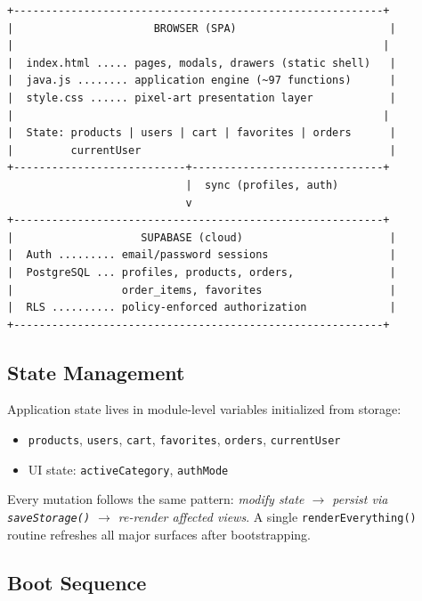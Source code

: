 \documentclass[11pt,a4paper]{article}
\begin{document}
\begin{lstlisting}[caption={Layered architecture (simplified).},language={}]
+----------------------------------------------------------+
|                      BROWSER (SPA)                        |
|                                                          |
|  index.html ..... pages, modals, drawers (static shell)   |
|  java.js ........ application engine (~97 functions)      |
|  style.css ...... pixel-art presentation layer            |
|                                                          |
|  State: products | users | cart | favorites | orders      |
|         currentUser                                       |
+---------------------------+------------------------------+
                            |  sync (profiles, auth)
                            v
+----------------------------------------------------------+
|                    SUPABASE (cloud)                       |
|  Auth ......... email/password sessions                   |
|  PostgreSQL ... profiles, products, orders,               |
|                 order_items, favorites                    |
|  RLS .......... policy-enforced authorization             |
+----------------------------------------------------------+
\end{lstlisting}

\subsection{State Management}

Application state lives in module-level variables initialized from storage:

\begin{itemize}[nosep]
    \item \texttt{products}, \texttt{users}, \texttt{cart},
          \texttt{favorites}, \texttt{orders}, \texttt{currentUser}
    \item UI state: \texttt{activeCategory}, \texttt{authMode}
\end{itemize}

Every mutation follows the same pattern: \emph{modify state $\rightarrow$
persist via \texttt{saveStorage()} $\rightarrow$ re-render affected views}.
A single \texttt{renderEverything()} routine refreshes all major surfaces
after bootstrapping.

\subsection{Boot Sequence}
\end{document}

